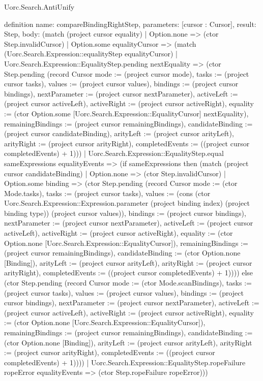 \begin{lexlean}{Uorc.Search.AntiUnify}
\begin{semanticmodule}
definition{
  name: compareBindingRightStep,
  parameters: [cursor : Cursor],
  result: Step,
  body: (match (project cursor equality)
    | Option.none => (ctor Step.invalidCursor)
    | Option.some equalityCursor => (match (Uorc.Search.Expression::equalityStep equalityCursor)
      | Uorc.Search.Expression::EqualityStep.pending nextEquality => (ctor Step.pending (record Cursor {mode := (project cursor mode), tasks := (project cursor tasks), values := (project cursor values), bindings := (project cursor bindings), nextParameter := (project cursor nextParameter), activeLeft := (project cursor activeLeft), activeRight := (project cursor activeRight), equality := (ctor Option.some [Uorc.Search.Expression::EqualityCursor] nextEquality), remainingBindings := (project cursor remainingBindings), candidateBinding := (project cursor candidateBinding), arityLeft := (project cursor arityLeft), arityRight := (project cursor arityRight), completedEvents := ((project cursor completedEvents) + 1)}))
      | Uorc.Search.Expression::EqualityStep.equal sameExpressions equalityEvents => (if sameExpressions then (match (project cursor candidateBinding)
        | Option.none => (ctor Step.invalidCursor)
        | Option.some binding => (ctor Step.pending (record Cursor {mode := (ctor Mode.tasks), tasks := (project cursor tasks), values := (cons (ctor Uorc.Search.Expression::Expression.parameter (project binding index) (project binding type)) (project cursor values)), bindings := (project cursor bindings), nextParameter := (project cursor nextParameter), activeLeft := (project cursor activeLeft), activeRight := (project cursor activeRight), equality := (ctor Option.none [Uorc.Search.Expression::EqualityCursor]), remainingBindings := (project cursor remainingBindings), candidateBinding := (ctor Option.none [Binding]), arityLeft := (project cursor arityLeft), arityRight := (project cursor arityRight), completedEvents := ((project cursor completedEvents) + 1)}))) else (ctor Step.pending (record Cursor {mode := (ctor Mode.scanBindings), tasks := (project cursor tasks), values := (project cursor values), bindings := (project cursor bindings), nextParameter := (project cursor nextParameter), activeLeft := (project cursor activeLeft), activeRight := (project cursor activeRight), equality := (ctor Option.none [Uorc.Search.Expression::EqualityCursor]), remainingBindings := (project cursor remainingBindings), candidateBinding := (ctor Option.none [Binding]), arityLeft := (project cursor arityLeft), arityRight := (project cursor arityRight), completedEvents := ((project cursor completedEvents) + 1)})))
      | Uorc.Search.Expression::EqualityStep.ropeFailure ropeError equalityEvents => (ctor Step.ropeFailure ropeError)))
}


\end{semanticmodule}
\end{lexlean}
